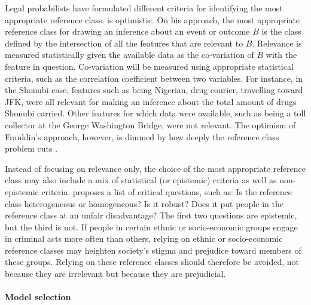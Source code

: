 \documentclass{article}
\begin{document}
Legal probabilists have formulated different criteria for identifying the most appropriate reference class.  \citet{franklin2011objective} is optimistic. %
On his approach, 
the most appropriate reference class for drawing an inference about an event or outcome $B$ is the class defined by the intersection of all the features that are relevant to $B$. Relevance is 
measured statistically given the available data as the co-variation of $B$ with  the feature in question. 
Co-variation will be measured using appropriate statistical criteria, such as the correlation coefficient between two variables. 
For instance, in  the Shonubi case,  features  such as being Nigerian, drug courier, travelling toward JFK, were all relevant for making an inference about the total amount of drugs Shonubi carried.  Other features for which data were available, such as being a toll collector at the George Washington Bridge, were not relevant.
The optimism of Franklin's approach, however, is dimmed by how deeply the reference class problem cuts  \citep[for more deatails, see][]{Hajek2007}.




Instead of focusing on relevance only, the choice of the most appropriate reference class may also include a mix of statistical (or epistemic) criteria as well as non-epistemic criteria. \citet{dahlman2017unacceptable} proposes a list of critical questions, such as:
Is the reference class heterogeneous or homogeneous? Is it robust? Does it put people in the reference class at an unfair disadvantage?
The first two questions are epistemic, but the third is not. %
 If people in certain ethnic or socio-economic groups engage in criminal acts more often than others, relying on ethnic or socio-economic reference classes may heighten society's stigma and  prejudice toward members of these groups. 
 Relying on these reference classes should therefore be avoided, not because they are irrelevant but because they are prejudicial. 





\paragraph{Model selection}
\end{document}
